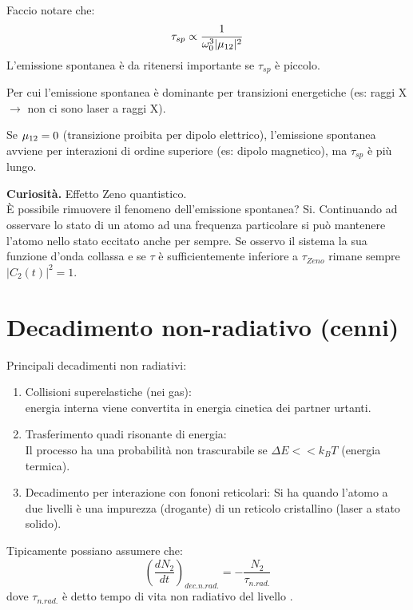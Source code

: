 Faccio notare che:
\begin{equation}
    \tau_{sp} \propto \frac{1}{\w_0^3 |\*\mu_{12}|^2}
\end{equation}
L'emissione spontanea è da ritenersi importante se $\tau_{sp}$ è piccolo.

Per cui l'emissione spontanea è dominante per transizioni energetiche (es: raggi X $\to$ non ci sono laser a raggi X).

Se $\*\mu_{12} = 0$ (transizione proibita per dipolo elettrico), l'emissione spontanea avviene per interazioni di ordine superiore (es: dipolo magnetico), ma $\tau_{sp}$ è più lungo.

\textbf{Curiosità.} Effetto Zeno quantistico.\\
È possibile rimuovere il fenomeno dell'emissione spontanea? Si. Continuando ad osservare lo stato di un atomo ad una frequenza particolare si può mantenere l'atomo nello stato eccitato anche per sempre.
Se osservo il sistema la sua funzione d'onda collassa e se $\tau$ è sufficientemente inferiore a $\tau_{Zeno}$ rimane sempre $|C_2(t)|^2 = 1$.


\section{Decadimento non-radiativo (cenni)}
Principali decadimenti non radiativi:
\begin{enumerate}
    \item Collisioni superelastiche (nei gas):\\
    energia  interna viene convertita in energia cinetica dei partner urtanti.
    
    \item Trasferimento quadi risonante di energia:\\
    Il processo ha una probabilità non trascurabile se $\Delta E << k_B T$ (energia termica).
    
    \item Decadimento per interazione con fononi reticolari:
    Si ha quando l'atomo a due livelli è una impurezza (drogante) di un reticolo cristallino (laser a stato solido).
\end{enumerate}
Tipicamente possiano assumere che:
\begin{equation}
    \left(\frac{dN_2}{dt}\right)_{dec.n.rad.} = -\frac{N_2}{\tau_{n.rad.}}
\end{equation}
dove $\tau_{n.rad.}$ è detto tempo di vita non radiativo del livello .

